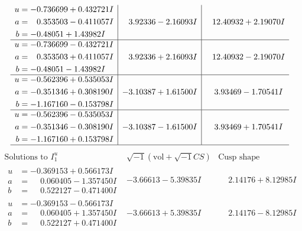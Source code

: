 \documentclass[1p]{elsarticle_modified}
\theoremstyle{definition}
\newcommand{\I}{\sqrt{-1}}
\begin{document}
$$\begin{array}{c|c|c}
\begin{aligned}
u &= -0.736699 + 0.432721 I \\
a &= \phantom{-}0.353503 - 0.411057 I \\
b &= -0.48051 + 1.43982 I\end{aligned}
 & \phantom{-}3.92336 - 2.16093 I & \phantom{-}12.40932 + 2.19070 I \\ \hline\begin{aligned}
u &= -0.736699 - 0.432721 I \\
a &= \phantom{-}0.353503 + 0.411057 I \\
b &= -0.48051 - 1.43982 I\end{aligned}
 & \phantom{-}3.92336 + 2.16093 I & \phantom{-}12.40932 - 2.19070 I \\ \hline\begin{aligned}
u &= -0.562396 + 0.535053 I \\
a &= -0.351346 + 0.308190 I \\
b &= -1.167160 - 0.153798 I\end{aligned}
 & -3.10387 + 1.61500 I & \phantom{-}3.93469 - 1.70541 I \\ \hline\begin{aligned}
u &= -0.562396 - 0.535053 I \\
a &= -0.351346 - 0.308190 I \\
b &= -1.167160 + 0.153798 I\end{aligned}
 & -3.10387 - 1.61500 I & \phantom{-}3.93469 + 1.70541 I\\
 \hline 
 \end{array}$$\newpage$$\begin{array}{c|c|c}  
\text{Solutions to }I^u_{1}& \I (\text{vol} + \sqrt{-1}CS) & \text{Cusp shape}\\
 \hline 
\begin{aligned}
u &= -0.369153 + 0.566173 I \\
a &= \phantom{-}0.060405 - 1.357450 I \\
b &= \phantom{-}0.522127 - 0.471400 I\end{aligned}
 & -3.66613 - 5.39835 I & \phantom{-}2.14176 + 8.12985 I \\ \hline\begin{aligned}
u &= -0.369153 - 0.566173 I \\
a &= \phantom{-}0.060405 + 1.357450 I \\
b &= \phantom{-}0.522127 + 0.471400 I\end{aligned}
 & -3.66613 + 5.39835 I & \phantom{-}2.14176 - 8.12985 I \\ \hline\begin{aligned}

\end{aligned}
\end{array}$$
\end{document}
